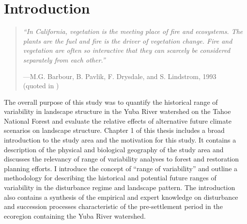 
\chapter{Introduction} %
\label{CH1}

\newcommand{\source}[1]{%
  \nobreak\parbox[t]{\linewidth}{\raggedleft #1}%
}%
\begin{quote}
\emph{“In California, vegetation is the meeting place of fire and ecosystems. The plants are the fuel and fire is the driver of vegetation change. Fire and vegetation are often so interactive that they can scarcely be considered separately from each other.”} \\
\medskip
  \source{%
    ---M.G. Barbour, B. Pavlik, F. Drysdale, and S. Lindstrom, 1993 \\ (quoted in \citet{Sugihara2006}) \\
  }
\end{quote}




The overall purpose of this study was to quantify the historical range of variability in landscape structure in the Yuba River watershed on the Tahoe National Forest and evaluate the relative effects of alternative future climate scenarios on landscape structure. Chapter 1 of this thesis includes a broad introduction to the study area and the motivation for this study. It contains a description of the physical and biological geography of the study area and discusses the relevancy of range of variability analyses to forest and restoration planning efforts. I introduce the concept of ``range of variability'' and outline a methodology for describing the historical and potential future ranges of variability in the disturbance regime and landscape pattern. The introduction also contains a synthesis of the empirical and expert knowledge on disturbance and succession processes characteristic of the pre-settlement period in the ecoregion containing the Yuba River watershed.

